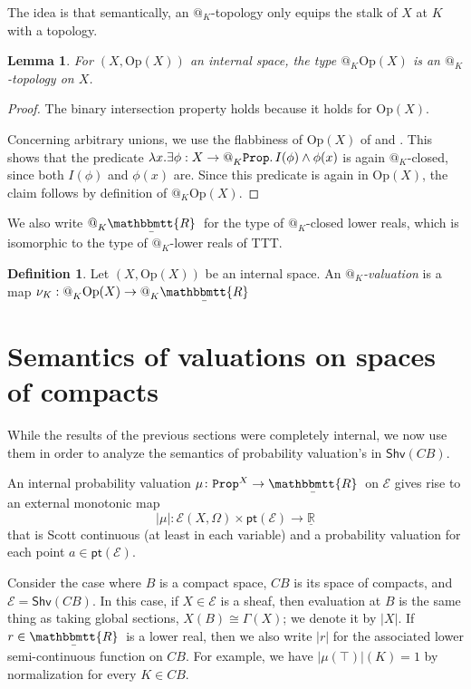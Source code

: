 \documentclass[11pt, oneside, article]{memoir}
\makeatletter
\newcommand{\tob}[1]{\todo[color=blue!40,inline]{\textbf{T:} #1}}
\theoremstyle{plain}
\newtheorem{lemma}[theorem]{Lemma}
\theoremstyle{definition}
\newtheorem{definition}[theorem]{Definition}
\theoremstyle{remark}
\newcommand{\const}[1]{\mathtt{#1}}
\newcommand{\Set}[1]{\mathrm{#1}}
\newcommand{\cat}[1]{\mathcal{#1}}
\newcommand{\Fun}[1]{\mathsf{#1}}
\newcommand{\ul}[1]{\underline{#1}}
\newcommand{\ubar}[1]{\underaccent{\bar}{#1}}
\newcommand{\internal}[1]{\raisebox{-.03ex}{$\mathbbmtt{#1}$}}
\newcommand{\hs}{\hspace{1.1pt}}
\newcommand{\LR}{\ul{\mathbb{R}}}
\newcommand{\tRR}{\internal{R}\hs}
\newcommand{\tLR}{\ubar{\tRR}\hs}
\newcommand{\Shv}{\Fun{Shv}}
\newcommand{\Prop}{\const{Prop}}
\newcommand{\Op}{\Set{Op}}
\newcommand{\pt}{\Fun{pt}}
\newcommand{\BaseSpace}{B}
\newcommand{\AtSymbol}{{@}}
\newcommand{\At}[2][]{\AtSymbol^{#1}_{#2}}
\makeatother
\begin{document}
The idea is that semantically, an $\At{K}$-topology only equips the stalk of $X$ at $K$ with a topology.

\begin{lemma}
	For $(X, \Op(X))$ an internal space, the type $\At{K} \Op(X)$ is an $\At{K}$-topology on $X$.
\end{lemma}

\begin{proof}
	The binary intersection property holds because it holds for $\Op(X)$.

	Concerning arbitrary unions, we use the flabbiness of $\Op(X)$ of  and . This shows that the predicate $\lambda x. \exists \phi : X \to \At{K} \Prop \ldotp I(\phi) \land \phi(x)$ is again $\At{K}$-closed, since both $I(\phi)$ and $\phi(x)$ are. Since this predicate is again in $\Op(X)$, the claim follows by definition of $\At{K} \Op(X)$.
\end{proof}

We also write $\At{K} \tLR$ for the type of $\At{K}$-closed lower reals, which is isomorphic to the type of $\At{K}$-lower reals of TTT.

\begin{definition}
	Let $(X, \Op(X))$ be an internal space. An \emph{$\At{K}$-valuation} is a map $\nu_K : \At{K} \Op(X) \to \At{K} \tLR$
	\tob{Think about directedness}
\end{definition}





\chapter{Semantics of valuations on spaces of compacts}

While the results of the previous sections were completely internal, we now use them in order to analyze the semantics of probability valuation's in $\Shv(C\BaseSpace)$.

An internal probability valuation $\mu\colon\Prop^X\to\tLR$ on $\cat{E}$ gives rise to an external monotonic map
\[|\mu|\colon\cat{E}(X,\Omega)\times\pt(\cat{E})\to\LR\]
that is Scott continuous (at least in each variable) and a probability valuation for each point $a\in\pt(\cat{E})$.


Consider the case where $\BaseSpace$ is a compact space, $C\BaseSpace$ is its space of compacts, and $\cat{E}=\Shv(C\BaseSpace)$. In this case, if $X\in\cat{E}$ is a sheaf, then evaluation at $\BaseSpace$ is the same thing as taking global sections, $X(\BaseSpace)\cong\Gamma(X)$; we denote it by $|X|$. If $r\in\tLR$ is a lower real, then we also write $|r|$ for the associated lower semi-continuous function on $C\BaseSpace$. For example, we have $|\mu(\top)|(K) = 1$ by normalization for every $K\in C\BaseSpace$.
\end{document}
